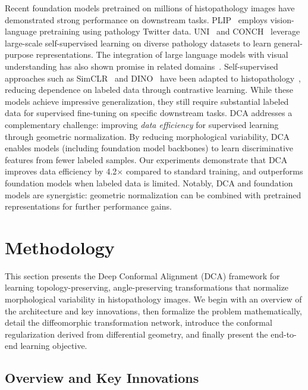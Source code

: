 \documentclass[final,3p,times,review,sort&compress]{elsarticle}
\begin{document}
Recent foundation models pretrained on millions of histopathology images have demonstrated strong performance on downstream tasks. PLIP~\cite{huang2023plip} employs vision-language pretraining using pathology Twitter data. UNI~\cite{chen2024uni} and CONCH~\cite{lu2024conch} leverage large-scale self-supervised learning on diverse pathology datasets to learn general-purpose representations. The integration of large language models with visual understanding has also shown promise in related domains~\cite{zhang2025pullm,zhang2025efficient}. Self-supervised approaches such as SimCLR~\cite{chen2020simple} and DINO~\cite{caron2021emerging} have been adapted to histopathology~\cite{wang2022transpath}, reducing dependence on labeled data through contrastive learning. While these models achieve impressive generalization, they still require substantial labeled data for supervised fine-tuning on specific downstream tasks. DCA addresses a complementary challenge: improving \textit{data efficiency} for supervised learning through geometric normalization. By reducing morphological variability, DCA enables models (including foundation model backbones) to learn discriminative features from fewer labeled samples. Our experiments demonstrate that DCA improves data efficiency by 4.2$\times$ compared to standard training, and outperforms foundation models when labeled data is limited. Notably, DCA and foundation models are synergistic: geometric normalization can be combined with pretrained representations for further performance gains.

\section{Methodology}
\label{sec:method}

This section presents the Deep Conformal Alignment (DCA) framework for learning topology-preserving, angle-preserving transformations that normalize morphological variability in histopathology images. We begin with an overview of the architecture and key innovations, then formalize the problem mathematically, detail the diffeomorphic transformation network, introduce the conformal regularization derived from differential geometry, and finally present the end-to-end learning objective.

\subsection{Overview and Key Innovations}
\end{document}

